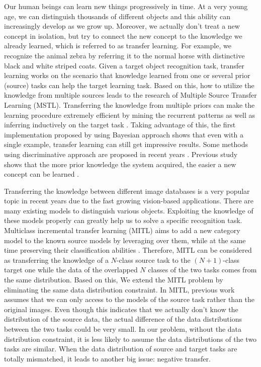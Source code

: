 Our human beings can learn new things progressively in time. At a very young age, we can distinguish thousands of different objects and this ability can increasingly develop as we grow up. Moreover, we actually don't treat a new concept in isolation, but try to connect the new concept to the knowledge we already learned, which is referred to as transfer learning. For example, we recognize the animal zebra by referring it to the normal horse with distinctive black and white striped coats. Given a target object recognition task, transfer learning works on the scenario that knowledge learned from one or several prior (source) tasks can help the target learning task. 
Based on this, how to utilize the knowledge from multiple sources leads to the research of Multiple Source Transfer
Learning (MSTL). Transferring the knowledge from multiple priors can make the learning procedure extremely efficient by mining the recurrent patterns as well as inferring inductively on the target task \cite{tommasi2014learning}. Taking advantage of this, the first implementation proposed by \cite{fei2006one} using Bayesian approach shows that even with a single example, transfer learning can still get impressive results. Some methods using discriminative approach are proposed in recent years \cite{tommasi2014learning} \cite{kuzborskij2013n} \cite{jie2011multiclass}. Previous study shows that the more prior knowledge the system acquired, the easier a new concept can be learned \cite{Thrun96islearning}.

Transferring the knowledge between different image databases is a very popular topic in recent years due to the fast growing vision-based applications. There are many existing models to distinguish various objects. Exploiting the knowledge of these models properly can greatly help us to solve a specific recognition task. Multiclass incremental transfer learning (MITL) aims to add a new category model to the known source models by leveraging over them, while at the same time preserving their classification abilities \cite{kuzborskij2013n}. Therefore, MITL can be considered as transferring the knowledge of a $N$-class source task to the $(N+1)$-class target one while the data of the overlapped $N$ classes of the two tasks comes from the same distribution.
Based on this, We extend the MITL problem by eliminating the same data distribution constraint. 
In MITL, previous work assumes that we can only access to the models of the source task rather than the original images. Even though this indicates that we actually don't know the distribution of the source data, the actual difference of the data distributions between the two tasks could be very small. In our problem, without the data distribution constraint, it is less likely to assume the data distributions of the two tasks are similar. When the data distribution of source and target tasks are totally mismatched, it leads to another big issue: negative transfer. 

